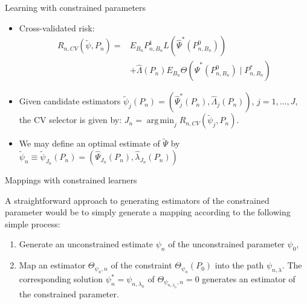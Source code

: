 \documentclass[12pt,t,handout]{beamer}
\DeclareMathOperator*{\argmin}{arg\,min}
\begin{document}

\begin{frame}[c]{Learning with constrained parameters}

\begin{center}
\begin{itemize}
  \itemsep14pt
  \item Cross-validated risk:
    \begin{align}
      R_{n, CV}(\tilde{\psi}, P_n) =& E_{B_n}P_{n, B_n}^1L(\hat{\Psi}^*(P_{n,
        B_n}^0)) \\ &+ \hat{\Lambda}(P_n) E_{B_n} \Theta(\hat{\Psi}^*(P_{n,
        B_n}^0) \mid P_{n, B_n}^*)
    \end{align}
  \item Given candidate estimators $\widetilde{\psi}_j(P_n) =
    (\hat{\Psi}_j^*(P_n), \hat{\Lambda}_j(P_n))$, $j = 1, \ldots, J$, the CV
    selector is given by: $J_n = \argmin_j R_{n, CV}(\widetilde{\psi}_j, P_n)$.
  \item We may define an optimal estimate of $\widetilde{\Psi}$ by
    $\widetilde{\psi}_n \equiv \widetilde{\psi}_{J_n}(P_n) =
    (\hat{\Psi}_{J_n}(P_n), \hat{\lambda}_{J_n}(P_n))$
\end{itemize}
\end{center}

\note{
}

\end{frame}


\begin{frame}[c]{Mappings with constrained learners}

\begin{center}
A straightforward approach to generating estimators of the constrained parameter
would be to simply generate a mapping according to the following simple process:

\vspace*{1em}

\begin{enumerate}
  \itemsep12pt
  \item Generate an unconstrained estimate $\psi_n$ of the unconstrained
    parameter $\psi_0$,
  \item Map an estimator $\Theta_{\psi_n, n}$ of the constraint
    $\Theta_{\psi_n}(P_0)$ into the path $\psi_{n, \lambda}$. The corresponding
    solution $\psi_n^* = \psi_{n, \lambda_n}$ of $\Theta_{\psi_{n, \lambda_n},
      n} = 0$ generates an estimator of the constrained parameter.
\end{enumerate}
\end{center}

\note{
}

\end{frame}
\end{document}
